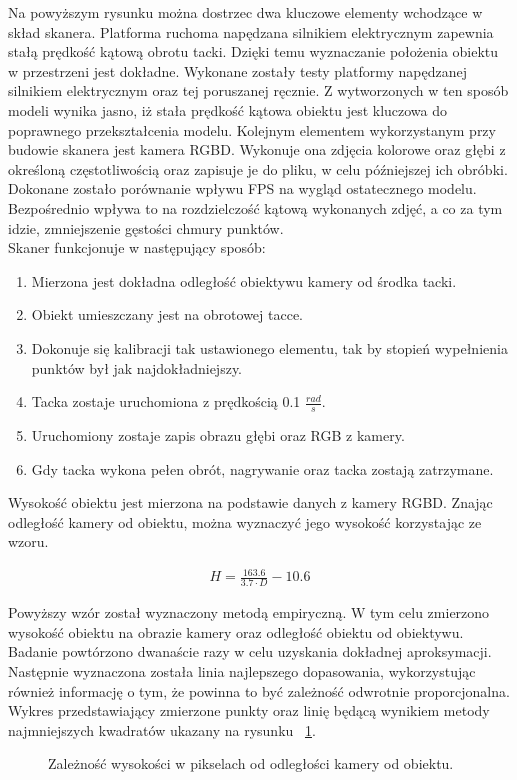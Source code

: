 Na powyższym rysunku można dostrzec dwa kluczowe elementy wchodzące w skład skanera. Platforma ruchoma napędzana silnikiem elektrycznym zapewnia stałą prędkość kątową obrotu tacki. Dzięki temu wyznaczanie położenia obiektu w przestrzeni jest dokładne. Wykonane zostały testy platformy napędzanej silnikiem elektrycznym oraz tej poruszanej ręcznie. Z wytworzonych w ten sposób modeli wynika jasno, iż stała prędkość kątowa obiektu jest kluczowa do poprawnego przekształcenia modelu. Kolejnym elementem wykorzystanym przy budowie skanera jest kamera RGBD. Wykonuje ona zdjęcia kolorowe oraz głębi z określoną częstotliwością oraz zapisuje je do pliku, w celu późniejszej ich obróbki. Dokonane zostało porównanie wpływu FPS na wygląd ostatecznego modelu. Bezpośrednio wpływa to na rozdzielczość kątową wykonanych zdjęć, a co za tym idzie, zmniejszenie gęstości chmury punktów.\\
Skaner funkcjonuje w następujący sposób:
\begin{enumerate}
    \item Mierzona jest dokładna odległość obiektywu kamery od środka tacki.
    \item Obiekt umieszczany jest na obrotowej tacce.
    \item Dokonuje się kalibracji tak ustawionego elementu, tak by stopień wypełnienia punktów był jak najdokładniejszy.
    \item Tacka zostaje uruchomiona z prędkością 0.1 $\frac{rad}{s}$.
    \item Uruchomiony zostaje zapis obrazu głębi oraz RGB z kamery.
    \item Gdy tacka wykona pełen obrót, nagrywanie oraz tacka zostają zatrzymane.
\end{enumerate}

Wysokość obiektu jest mierzona na podstawie danych z kamery RGBD. Znając odległość kamery od obiektu, można wyznaczyć jego wysokość korzystając ze wzoru.

\begin{equation}
    \begin{aligned}
        H=\frac{163.6}{3.7 \cdot D} -10.6
    \end{aligned}
\end{equation}

Powyższy wzór został wyznaczony metodą empiryczną. W tym celu zmierzono wysokość obiektu na obrazie kamery oraz odległość obiektu od obiektywu. Badanie powtórzono dwanaście razy w celu uzyskania dokładnej aproksymacji. Następnie wyznaczona została linia najlepszego dopasowania, wykorzystując również informację o tym, że powinna to być zależność odwrotnie proporcjonalna. Wykres przedstawiający zmierzone punkty oraz linię będącą wynikiem metody najmniejszych kwadratów ukazany na rysunku ~\ref{fig:wysokoscOdleglosc}.
\begin{figure}[H]
  \centering
    

  \caption{Zależność wysokości w pikselach od odległości kamery od obiektu.}   
  \label{fig:wysokoscOdleglosc}
\end{figure}
